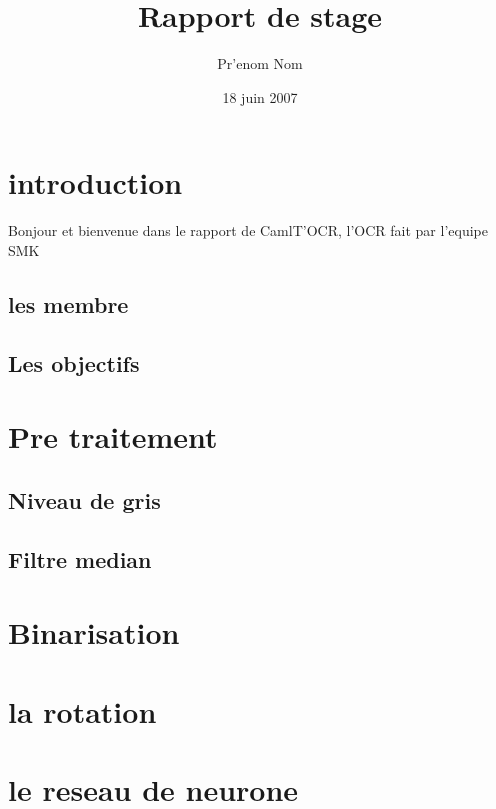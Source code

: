 \documentclass[a4paper, titlepage]{article}
\title{Rapport de stage}
\author{Pr'enom Nom}
\date{18 juin 2007}
\begin{document}
\tableofcontent
\section{introduction}
Bonjour et bienvenue dans le rapport de CamlT'OCR, l'OCR fait par l'equipe SMK
\subsection{les membre}
\subsection{Les objectifs}
\section{Pre traitement}
\subsection{Niveau de gris}
\subsection{Filtre median}
\section{Binarisation}
\section{la rotation}
\section{le reseau de neurone}
\end{document}
